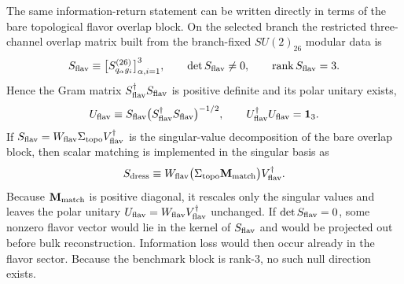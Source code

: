 \documentclass[11pt]{article}
\begin{document}
The same information-return statement can be written directly in terms of the bare topological flavor overlap block. On the selected branch the restricted three-channel overlap matrix built from the branch-fixed $SU(2)_{26}$ modular data is
\begin{equation}
\label{eq:gravity-flavor-overlap}
 S_{\rm flav}
 \equiv
 \bigl[S^{(26)}_{q_{\alpha}g_i}\bigr]_{\alpha,i=1}^{3},
 \qquad
 \det S_{\rm flav}\neq0,
 \qquad
 \operatorname{rank}S_{\rm flav}=3.
\end{equation}
Hence the Gram matrix $S_{\rm flav}^{\dagger}S_{\rm flav}$ is positive definite and its polar unitary exists,
\begin{equation}
\label{eq:gravity-flavor-polar}
 U_{\rm flav}
 \equiv
 S_{\rm flav}\bigl(S_{\rm flav}^{\dagger}S_{\rm flav}\bigr)^{-1/2},
 \qquad
 U_{\rm flav}^{\dagger}U_{\rm flav}=\mathbf 1_3.
\end{equation}
If $S_{\rm flav}=W_{\rm flav}\Sigma_{\rm topo}V_{\rm flav}^{\dagger}$ is the
singular-value decomposition of the bare overlap block, then scalar matching is
implemented in the singular basis as
\begin{equation}
\label{eq:gravity-flavor-dressed-overlap}
 S_{\rm dress}
 \equiv
 W_{\rm flav}\bigl(\Sigma_{\rm topo}\mathbf M_{\rm match}\bigr)V_{\rm flav}^{\dagger}.
\end{equation}
Because $\mathbf M_{\rm match}$ is positive diagonal, it rescales only the
singular values and leaves the polar unitary $U_{\rm flav}=W_{\rm flav}V_{\rm flav}^{\dagger}$ unchanged.
If $\det S_{\rm flav}=0$, some nonzero flavor vector would lie in the kernel of $S_{\rm flav}$ and would be projected out before bulk reconstruction. Information loss would then occur already in the flavor sector. Because the benchmark block is rank-$3$, no such null direction exists.
\end{document}
